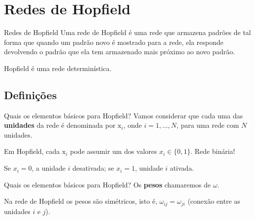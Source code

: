 \section{Redes de Hopfield}

\begin{frame}{Redes de Hopfield}%
  \justifying%
  Uma rede de Hopfield é uma rede que armazena padrões de tal forma que quando um padrão novo é mostrado para a rede, ela responde devolvendo o padrão que ela tem armazenado mais próximo ao novo padrão.

  Hopfield é uma rede determinística.
\end{frame}

\subsection{Definições}
\begin{frame}{Quais os elementos básicos para Hopfield?}%
  \justifying%
  Vamos considerar que cada uma das \textbf{unidades} da rede é denominada por $\mathrm{x}_{i}$, onde $i = 1, \dots, N$, para uma rede com $N$ unidades.

  Em Hopfield, cada $\mathrm{x}_{i}$ pode assumir um dos valores $x_{i} \in \{0, 1\}$. Rede binária!

  Se $x_{i} = 0$, a unidade $i$ desativada; se $x_{i} = 1$, unidade $i$ ativada.
\end{frame}

\begin{frame}{Quais os elementos básicos para Hopfield?}%
  \justifying%
  Os \textbf{pesos} chamaremos de $\omega$.

  Na rede de Hopfield os pesos são simétricos, isto é, $\omega_{ij} = \omega_{ji}$ (conexão entre as unidades $i$ e $j$).

\end{frame}

